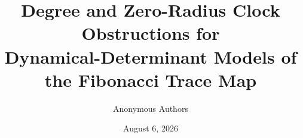 \documentclass[11pt]{article}
\title{Degree and Zero-Radius Clock Obstructions for\\
Dynamical-Determinant Models of the Fibonacci Trace Map}
\author{Anonymous Authors}
\date{August 6, 2026}
\theoremstyle{definition}
\theoremstyle{remark}
\begin{document}
\maketitle
\begin{abstract}

\end{abstract}








\appendix




\end{document}
